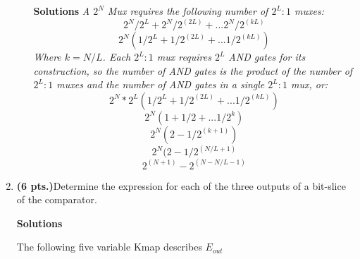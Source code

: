 \begin{enumerate}
\begin{enumerate}
                \begin{onlysolution} \textbf{Solutions} \itshape{
                        A $2^N$ Mux requires the following number of $2^L:1$ muxes:
                        $$ 2^N/2^L + 2^N/2^(2L) + ... 2^N/2^(kL) $$
                        $$ 2^N(1/2^L + 1/2^(2L) + ... 1/2^(kL)) $$
                        Where $k = N/L$.  Each $2^L:1$ mux requires $2^L$ AND gates for its construction,
                        so the number of AND gates is the product of the number of $2^L:1$ muxes and the
                        number of AND gates in a single $2^L:1$ mux, or:
                        $$ 2^N * 2^L(1/2^L + 1/2^(2L) + ... 1/2^(kL)) $$
                        $$ 2^N (1 + 1/2 + ... 1/2^k) $$
                        $$ 2^N (2-1/2^(k+1)) $$
                        $$ 2^N (2-1/2^(N/L+1) $$
                            $$ 2^(N+1) - 2^(N-N/L-1) $$
                        }
                    \end{onlysolution}

            \end{enumerate}

        \item \textbf{ (6 pts.)}Determine the \SOPmin expression for each of the
            three outputs of a bit-slice of the comparator.

            \begin{onlysolution} \textbf{Solutions} \itshape{
                    The following five variable Kmap describes $E_{out}$

}
\end{onlysolution}
\end{enumerate}
